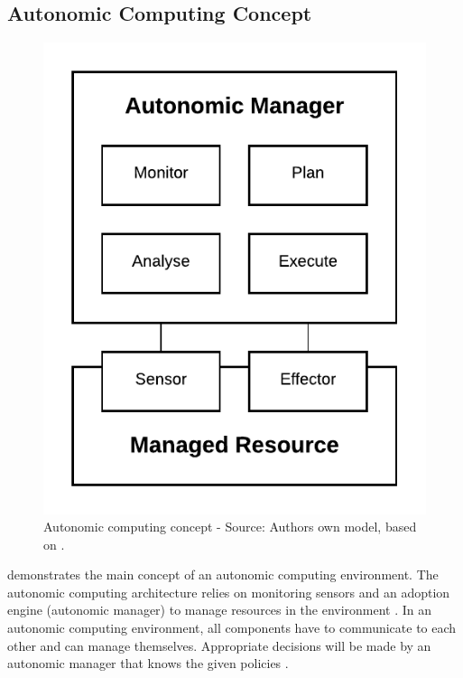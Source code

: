 \subsection{Autonomic Computing Concept}

\begin{figure}[h]
\centering
\includegraphics[scale=1]{images/02_theoretical_foundation/autonomic_computing/autonomic_computing_concept}
\caption{Autonomic computing concept - Source: Authors own model, based on \cite{Jacob2004AutonomicSolution}.}
\label{fig:ac_concept}
\end{figure}

 demonstrates the main concept of an autonomic computing environment. The autonomic computing architecture relies on monitoring sensors and an adoption engine (autonomic manager) to manage resources in the environment \cite{Goscinski2011CloudComputing}.
In an autonomic computing environment, all components have to communicate to each other and can manage themselves. Appropriate decisions will be made by an autonomic manager that knows the given policies \cite{Jacob2004AutonomicSolution}.


